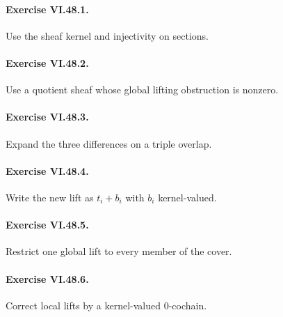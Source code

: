 \paragraph{Exercise VI.48.1.}
\begin{hint}
Use the sheaf kernel and injectivity on sections.
\end{hint}

\paragraph{Exercise VI.48.2.}
\begin{hint}
Use a quotient sheaf whose global lifting obstruction is nonzero.
\end{hint}

\paragraph{Exercise VI.48.3.}
\begin{hint}
Expand the three differences on a triple overlap.
\end{hint}

\paragraph{Exercise VI.48.4.}
\begin{hint}
Write the new lift as \(t_i+b_i\) with \(b_i\) kernel-valued.
\end{hint}

\paragraph{Exercise VI.48.5.}
\begin{hint}
Restrict one global lift to every member of the cover.
\end{hint}

\paragraph{Exercise VI.48.6.}
\begin{hint}
Correct local lifts by a kernel-valued \(0\)-cochain.
\end{hint}

